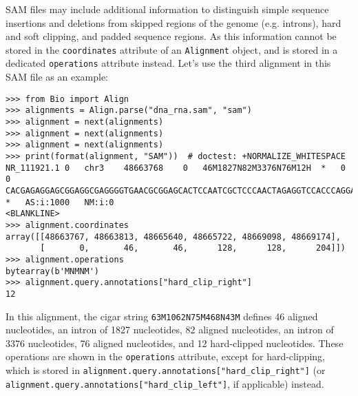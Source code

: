 SAM files may include additional information to distinguish simple sequence insertions and deletions from skipped regions of the genome (e.g. introns), hard and soft clipping, and padded sequence regions. As this information cannot be stored in the \verb|coordinates| attribute of an \verb|Alignment| object, and is stored in a dedicated \verb|operations| attribute instead. Let's use the third alignment in this SAM file as an example:
\begin{verbatim}
>>> from Bio import Align
>>> alignments = Align.parse("dna_rna.sam", "sam")
>>> alignment = next(alignments)
>>> alignment = next(alignments)
>>> alignment = next(alignments)
>>> print(format(alignment, "SAM"))  # doctest: +NORMALIZE_WHITESPACE
NR_111921.1	0	chr3	48663768	0	46M1827N82M3376N76M12H	*	0	0	CACGAGAGGAGCGGAGGCGAGGGGTGAACGCGGAGCACTCCAATCGCTCCCAACTAGAGGTCCACCCAGGACCCAGAGACCTGGATTTGAGGCTGCTGGGCGGCAGATGGAGCGATCAGAAGACCAGGAGACGGGAGCTGGAGTGCAGTGGCTGTTCACAAGCGTGAAAGCAAAGATTAAAAAATTTGTTTTTATATTAAAAAA	*	AS:i:1000	NM:i:0
<BLANKLINE>
>>> alignment.coordinates
array([[48663767, 48663813, 48665640, 48665722, 48669098, 48669174],
       [       0,       46,       46,      128,      128,      204]])
>>> alignment.operations
bytearray(b'MNMNM')
>>> alignment.query.annotations["hard_clip_right"]
12
\end{verbatim}
In this alignment, the cigar string \verb|63M1062N75M468N43M| defines 46 aligned nucleotides, an intron of 1827 nucleotides, 82 aligned nucleotides, an intron of 3376 nucleotides, 76 aligned nucleotides, and 12 hard-clipped nucleotides. These operations are shown in the \verb|operations| attribute, except for hard-clipping, which is stored in \verb|alignment.query.annotations["hard_clip_right"]| (or \verb|alignment.query.annotations["hard_clip_left"]|, if applicable) instead.

